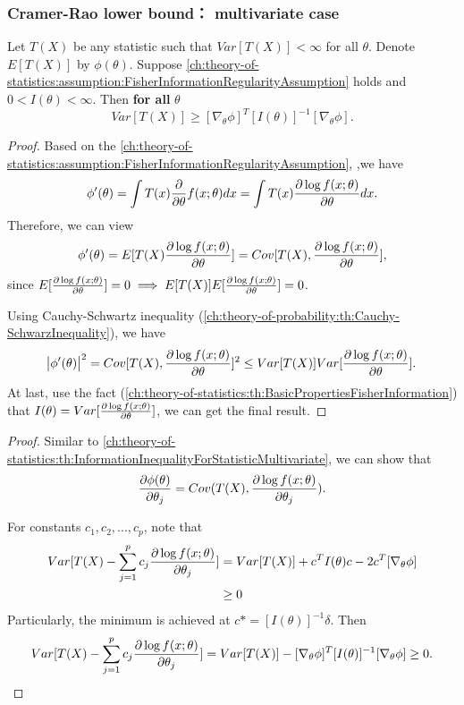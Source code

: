 \begin{refsection}
\subsubsection{Cramer-Rao lower bound： multivariate case}

\begin{theorem}\label{ch:theory-of-statistics:th:InformationInequalityForStatisticMultivariate}
	Let $T(X)$ be any statistic such that $Var[T(X)] < \infty$ for all $\theta$. Denote $E[T(X)]$ by $\phi(\theta)$. Suppose \autoref{ch:theory-of-statistics:assumption:FisherInformationRegularityAssumption} holds and $0 < I(\theta) < \infty$. Then \textbf{for all} $\theta$
	$$Var[T(X)] \geq [\nabla_{\theta}\phi]^T [I(\theta)]^{-1}[\nabla_{\theta}\phi].$$	
\end{theorem}
\begin{proof}
	Based on the \autoref{ch:theory-of-statistics:assumption:FisherInformationRegularityAssumption}, ,we have
	$$\phi'(\theta) = \int T(x)\frac{\partial }{\partial \theta} f(x;\theta) dx = \int T(x)\frac{\partial \log f(x;\theta) }{\partial \theta}  dx.$$
	Therefore, we can view
	$$\phi'(\theta) = E[T(X)\frac{\partial \log f(x;\theta) }{\partial \theta}] = Cov[T(X),\frac{\partial \log f(x;\theta) }{\partial \theta}],$$
	since $E[\frac{\partial \log f(x;\theta) }{\partial \theta}] = 0 \implies E[T(X)]E[\frac{\partial \log f(x;\theta) }{\partial \theta}] = 0$.
	
	Using Cauchy-Schwartz inequality (\autoref{ch:theory-of-probability:th:Cauchy-SchwarzInequality}), we have
	$$\abs{\phi'(\theta)}^2 = Cov[T(X),\frac{\partial \log f(x;\theta) }{\partial \theta}]^2 \leq Var[T(X)]Var[\frac{\partial \log f(x;\theta) }{\partial \theta}].$$
	At last, use the fact (\autoref{ch:theory-of-statistics:th:BasicPropertiesFisherInformation}) that $I(\theta) = Var[\frac{\partial \log f(x;\theta) }{\partial \theta}]$, we can get the final result. 	
\end{proof}
\begin{proof}
Similar to \autoref{ch:theory-of-statistics:th:InformationInequalityForStatisticMultivariate}, we can show that
$$\frac{\partial \phi(\theta)}{\partial \theta_j} = Cov(T(X), \frac{\partial \log f(x;\theta) }{\partial \theta_j}).$$

For constants $c_1,c_2,...,c_p$, note that
\begin{align*}
Var[T(X) - \sum_{j=1}^p c_j \frac{\partial \log f(x;\theta) }{\partial \theta_j}] &= Var[T(X)] + c^TI(\theta)c - 2c^T [\nabla_{\theta}\phi] \\
&\geq 0
\end{align*}
Particularly, the minimum is achieved at $c* = [I(\theta)]^{-1}\delta$. Then
$$Var[T(X) - \sum_{j=1}^p c_j \frac{\partial \log f(x;\theta) }{\partial \theta_j}] = Var[T(X)] -  [\nabla_{\theta}\phi]^T [I(\theta)]^{-1}[\nabla_{\theta}\phi] \geq 0. $$
\end{proof}


\end{refsection}
